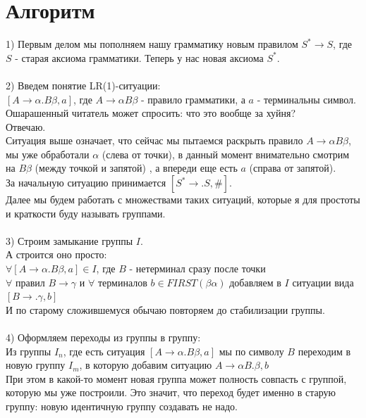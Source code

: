 \documentclass[14pt]{extreport}
\begin{document}
	\section{Алгоритм}
	1) Первым делом мы пополняем нашу грамматику новым правилом $S^* \to S$, где $S$ -
	старая аксиома грамматики. Теперь у нас новая аксиома $S^*$.\\\\
	2) Введем понятие LR(1)-ситуации:\\
	$[A \to \alpha . B\beta , a]$, где $A \to \alpha B \beta$ - правило грамматики, а $a$ -
	терминальны символ.\\
	Ошарашенный читатель может спросить: что это вообще за хуйня?\\
	Отвечаю.\\
	Ситуация выше означает, что сейчас мы пытаемся раскрыть правило $A \to \alpha B \beta$,
	мы уже обработали $\alpha$ (слева от точки), в данный момент внимательно смотрим на 
	$B\beta$ (между точкой и запятой) , а впереди еще есть $a$ (справа от запятой).\\
	За начальную ситуацию принимается $[S^* \to .S,\#]$.\\
	Далее мы будем работать с множествами таких ситуаций, которые я для простоты и краткости
	буду называть группами.\\\\
	3) Строим замыкание группы $I$.\\
	А строится оно просто:\\
	$\forall [A \to \alpha . B \beta , a] \in I$, где $B$ - нетерминал сразу после точки\\
	$\forall $ правил $B \to \gamma$ и $\forall$ терминалов $b \in FIRST(\beta \alpha)$
	добавляем в $I$ ситуации вида\\
	$[B \to . \gamma , b]$\\
	И по старому сложившемуся обычаю повторяем до стабилизации группы.\\\\
	4) Оформляем переходы из группы в группу:\\
	Из группы $I_n$, где есть ситуация $[A \to \alpha . B \beta , a]$ мы по символу $B$
	переходим в новую группу $I_m$, в которую добавим ситуацию $A \to \alpha B . \beta , b$\\
	При этом в какой-то момент новая группа может полность совпасть с группой, которую мы
	уже построили. Это значит, что переход будет именно в старую группу: новую идентичную
	группу создавать не надо.\\\\
\end{document}
